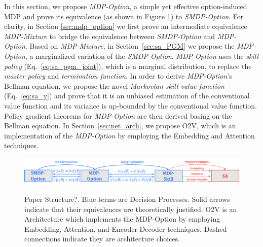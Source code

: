 \documentclass{article}
\newcommand{\red}[1]{\textcolor[HTML]{EB4335}{#1}}
\newcommand{\blue}[1]{\textcolor[HTML]{4285F4}{#1}}
\begin{document}
In this section, we propose \emph{MDP-Option}, a simple yet
effective option-induced MDP and prove its equivalence (as shown
in Figure \ref{fig:sa_logic}) to \emph{SMDP-Option}. For clarity,
in Section \ref{sec:mdp_option} we first prove an intermediate
equivalence \emph{MDP-Mixture} to bridge the equivalence between
\emph{SMDP-Option} and \emph{MDP-Option}. Based on
\emph{MDP-Mixture}, in Section~\ref{sec:sa_PGM} we propose the
\emph{MDP-Option}, a marginalized variation of the \emph{SMDP-Option}. \emph{MDP-Option}
uses the \emph{skill policy} (Eq.~\ref{eq:sa_pgm_joint}), which
is a marginal distribution, to replace the \emph{master policy}
and \emph{termination function}. In order to derive \emph{MDP-Option}'s
Bellman equation, we propose the novel \emph{Markovian
  skill-value function} (Eq.~\ref{eq:sa_v}) and prove that it is
an unbiased estimation of the conventional value function and its
variance is up-bounded by the conventional value function. Policy
gradient theorems for \emph{MDP-Option} are then derived basing on the
Bellman equation. In Section~\ref{sec:net_arch}, we propose O2V,
which is an implementation of the \emph{MDP-Option} by employing the
Embedding and Attention \cite{vaswani2017attention} techniques.
\begin{figure}[h!]
  \vspace{-4mm} \centering
  \includegraphics[width=1\linewidth]{figures/SA_Logics.png}\\
  \caption{\label{fig:sa_logic} \red{Paper Structure?}.
    \blue{Blue} terms are \blue{Decision Processes}. Solid arrows
    indicate that their equivalences are theoretically justified.
    \red{O2V} is an \red{Architecture} which implements the
    \blue{MDP-Option} by employing Embedding, Attention, and
    Encoder-Decoder techniques. Dashed connections indicate they
    are architecture choices.}
\vspace{-5.5mm}
\end{figure}

\end{document}
